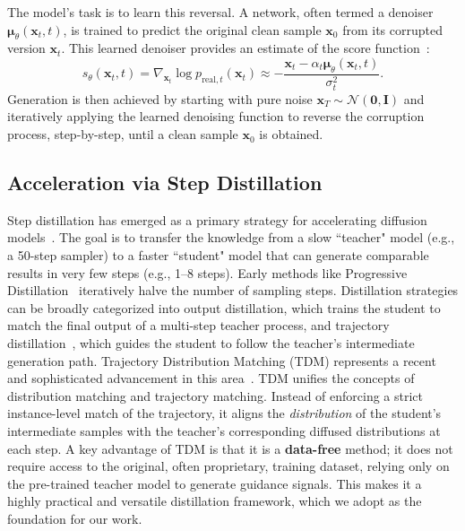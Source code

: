 \documentclass[letterpaper]{article} %
\begin{document}
The model's task is to learn this reversal. A network, often termed a denoiser $\boldsymbol{\mu}_{\theta}(\mathbf{x}_t, t)$, is trained to predict the original clean sample $\mathbf{x}_0$ from its corrupted version $\mathbf{x}_t$. This learned denoiser provides an estimate of the score function~\cite{song2021scorebasedgenerativemodelingstochastic}:
\begin{equation}
\label{eq:score_matching}
s_{\theta}(\mathbf{x}_t, t) = \nabla_{\mathbf{x}_t} \log p_{\text{real},t}(\mathbf{x}_t) \approx - \frac{\mathbf{x}_t - \alpha_t \boldsymbol{\mu}_{\theta}(\mathbf{x}_t, t)}{\sigma_t^2}.
\end{equation}
Generation is then achieved by starting with pure noise $\mathbf{x}_T \sim \mathcal{N}(\mathbf{0}, \mathbf{I})$ and iteratively applying the learned denoising function to reverse the corruption process, step-by-step, until a clean sample $\mathbf{x}_0$ is obtained.
\subsection{Acceleration via Step Distillation}
Step distillation has emerged as a primary strategy for accelerating diffusion models~\cite{song2023consistency,salimans2022progressivedistillationfastsampling,liu2024instaflowstephighqualitydiffusionbased,zheng2024trajectoryconsistencydistillationimproved,gu2023bootdatafreedistillationdenoising,goodfellow2014generativeadversarialnetworks}. The goal is to transfer the knowledge from a slow ``teacher" model (e.g., a 50-step sampler) to a faster ``student" model that can generate comparable results in very few steps (e.g., 1--8 steps). Early methods like Progressive Distillation~\cite{salimans2022progressivedistillationfastsampling,luhman2021knowledgedistillationiterativegenerative} iteratively halve the number of sampling steps. Distillation strategies can be broadly categorized into output distillation, which trains the student to match the final output of a multi-step teacher process, and trajectory distillation~\cite{luhman2021knowledgedistillationiterativegenerative,song2023consistency}, which guides the student to follow the teacher's intermediate generation path. Trajectory Distribution Matching (TDM) represents a recent and sophisticated advancement in this area~\cite{luo2025tdm}. TDM unifies the concepts of distribution matching and trajectory matching. Instead of enforcing a strict instance-level match of the trajectory, it aligns the \textit{distribution} of the student's intermediate samples with the teacher's corresponding diffused distributions at each step. A key advantage of TDM is that it is a \textbf{data-free} method; it does not require access to the original, often proprietary, training dataset, relying only on the pre-trained teacher model to generate guidance signals. This makes it a highly practical and versatile distillation framework, which we adopt as the foundation for our work.
\end{document}
